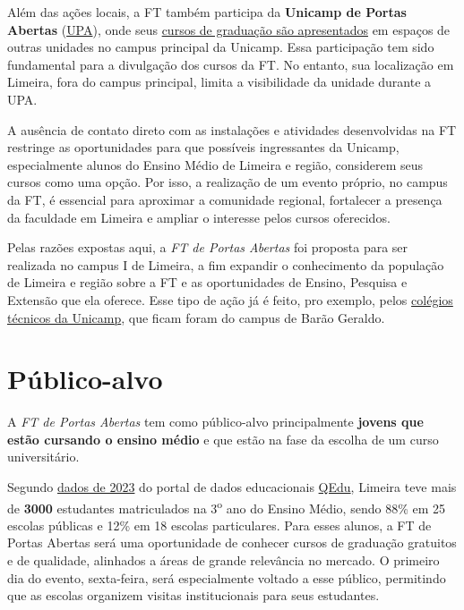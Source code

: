 \documentclass[
  letterpaper,
  DIV=11,
  numbers=noendperiod]{scrreprt}
\begin{document}
Além das ações locais, a FT também participa da \textbf{Unicamp de
Portas Abertas} (\href{https://upa.unicamp.br/}{UPA}), onde seus
\href{https://wordpress.ft.unicamp.br/upa/}{cursos de graduação são
apresentados} em espaços de outras unidades no campus principal da
Unicamp. Essa participação tem sido fundamental para a divulgação dos
cursos da FT. No entanto, sua localização em Limeira, fora do campus
principal, limita a visibilidade da unidade durante a UPA.

A ausência de contato direto com as instalações e atividades
desenvolvidas na FT restringe as oportunidades para que possíveis
ingressantes da Unicamp, especialmente alunos do Ensino Médio de Limeira
e região, considerem seus cursos como uma opção. Por isso, a realização
de um evento próprio, no campus da FT, é essencial para aproximar a
comunidade regional, fortalecer a presença da faculdade em Limeira e
ampliar o interesse pelos cursos oferecidos.

Pelas razões expostas aqui, a \emph{FT de Portas Abertas} foi proposta
para ser realizada no campus I de Limeira, a fim expandir o conhecimento
da população de Limeira e região sobre a FT e as oportunidades de
Ensino, Pesquisa e Extensão que ela oferece. Esse tipo de ação já é
feito, pro exemplo, pelos
\href{https://unicamp.br/noticias/2024/07/24/colegios-tecnicos-da-unicamp-abrem-portas-para-novos-estudantes/}{colégios
técnicos da Unicamp}, que ficam foram do campus de Barão Geraldo.

\section{Público-alvo}\label{puxfablico-alvo}

A \emph{FT de Portas Abertas} tem como público-alvo principalmente
\textbf{jovens que estão cursando o ensino médio} e que estão na fase da
escolha de um curso universitário.

Segundo
\href{https://qedu.org.br/municipio/3526902-limeira/censo-escolar}{dados
de 2023} do portal de dados educacionais
\href{https://qedu.org.br/}{QEdu}, Limeira teve mais de \textbf{3000}
estudantes matriculados na 3\textsuperscript{o} ano do Ensino Médio,
sendo 88\% em 25 escolas públicas e 12\% em 18 escolas particulares.
Para esses alunos, a FT de Portas Abertas será uma oportunidade de
conhecer cursos de graduação gratuitos e de qualidade, alinhados a áreas
de grande relevância no mercado. O primeiro dia do evento, sexta-feira,
será especialmente voltado a esse público, permitindo que as escolas
organizem visitas institucionais para seus estudantes.
\end{document}
